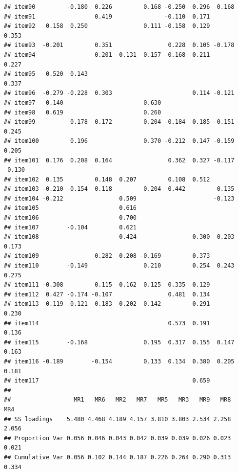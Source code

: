 \documentclass[
  english,
  man]{apa6}
\begin{document}
\begin{verbatim}
## item90         -0.180  0.226         0.168 -0.250  0.296  0.168       
## item91                 0.419               -0.110  0.171              
## item92   0.158  0.250                0.111 -0.158  0.129         0.353
## item93  -0.201         0.351                0.228  0.105 -0.178       
## item94                 0.201  0.131  0.157 -0.168  0.211         0.227
## item95   0.520  0.143                                            0.337
## item96  -0.279 -0.228  0.303                       0.114 -0.121       
## item97   0.140                       0.630                            
## item98   0.619                       0.260                            
## item99          0.178  0.172         0.204 -0.184  0.185 -0.151  0.245
## item100         0.196                0.370 -0.212  0.147 -0.159  0.205
## item101  0.176  0.208  0.164                0.362  0.327 -0.117 -0.130
## item102  0.135         0.148  0.207         0.108  0.512              
## item103 -0.210 -0.154  0.118         0.204  0.442         0.135       
## item104 -0.212                0.509                      -0.123       
## item105                       0.616                                   
## item106                       0.700                                   
## item107        -0.104         0.621                                   
## item108                       0.424                0.300  0.203  0.173
## item109                0.282  0.208 -0.169         0.373              
## item110        -0.149                0.210         0.254  0.243  0.275
## item111 -0.308         0.115  0.162  0.125  0.335  0.129              
## item112  0.427 -0.174 -0.107                0.481  0.134              
## item113 -0.119 -0.121  0.183  0.202  0.142         0.291         0.230
## item114                                     0.573  0.191         0.136
## item115        -0.168                0.195  0.317  0.155  0.147  0.163
## item116 -0.189        -0.154         0.133  0.134  0.380  0.205  0.181
## item117                                            0.659              
## 
##                  MR1   MR6   MR2   MR7   MR5   MR3   MR9   MR8   MR4
## SS loadings    5.480 4.468 4.189 4.157 3.810 3.803 2.534 2.258 2.056
## Proportion Var 0.056 0.046 0.043 0.042 0.039 0.039 0.026 0.023 0.021
## Cumulative Var 0.056 0.102 0.144 0.187 0.226 0.264 0.290 0.313 0.334
\end{verbatim}
\end{document}
